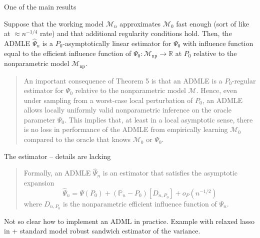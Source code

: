 \documentclass[smaller]{beamer}\usepackage{listings}
\newcommand{\R}{\mathbb{R}}
\newcommand\smallO{\textit{o}}
\newcommand{\1}{\mathds{1}}
\newcommand{\empmeas}{\ensuremath{\mathbb{P}_n}} %
\begin{document}
\begin{frame}[label={sec:orga5820ca}]{One of the main results}
\begin{theorem}[Theorem 5]
Suppose that the working model \(\mathcal{M}_n\) approximates \(\mathcal{M}_0\) fast enough (sort of like at \(\approx n^{-1/4}\) rate) and that additional
regularity conditions hold. Then, the ADMLE \(\hat{\Psi}_n\) is a \(P_0\)-asymptotically linear estimator for \(\Psi_0\) with influence function equal to
the efficient influence function of \(\Psi_0 \colon \mathcal{M}_{\mathrm{np}}
\rightarrow \R\) at \(P_0\) relative to the nonparametric model \(\mathcal{M}_{\mathrm{np}}\).

\vspace{.5cm}
\end{theorem}

\begin{quote} %
\small

An important consequence of Theorem 5 is that an ADMLE is a \(P_0\)-regular
estimator for \(\Psi_0\) relative to the nonparametric model \(\mathcal{M}\).
Hence, even under sampling from a worst-case local perturbation of \(P_0\), an
ADMLE allows locally uniformly valid nonparametric inference on the oracle
parameter \(\Psi_0\). This implies that, at least in a local asymptotic sense,
there is no loss in performance of the ADMLE from empirically learning \(\mathcal{M}_0\) compared to the oracle that knows \(\mathcal{M}_0\) or
\(\Psi_0\).

\flushright \cite{van2023adaptive}
\end{quote}
\end{frame}

\begin{frame}[label={sec:orge1ac269}]{The estimator -- details are lacking}
\begin{quote} %

Formally, an ADMLE \( \hat{\Psi}_n \) is an estimator that satisfies the
asymptotic expansion
\begin{equation*}
  \hat{\Psi}_n  =  \Psi(P_0) + (\empmeas - P_0){[D_{n,P_0}]} + \smallO_P{(n^{-1/2})}
\end{equation*}
where \( D_{n,P_0} \) is the nonparametric efficient influence function of
$\Psi_n$.

\flushright \cite{van2023adaptive}

\vfill
\end{quote}

\begin{block}{}
Not so clear how to implement an ADML in practice. Example with relaxed lasso
in + standard model robust sandwich estimator of the variance.
\end{block}
\end{frame}
\end{document}
